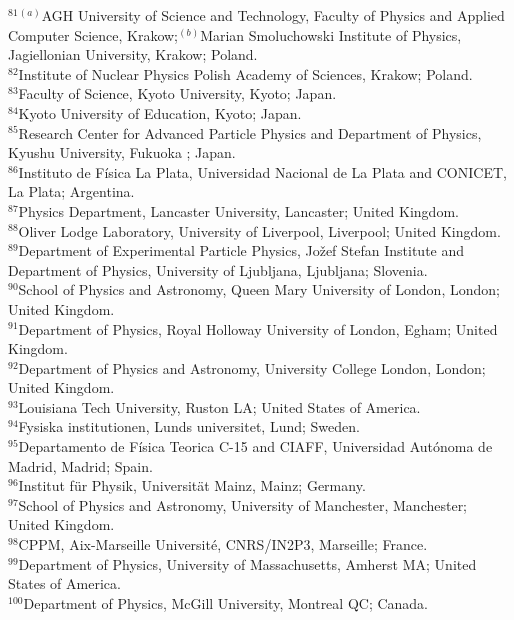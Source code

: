 \begin{flushleft}
$^{81}$$^{(a)}$AGH University of Science and Technology, Faculty of Physics and Applied Computer Science, Krakow;$^{(b)}$Marian Smoluchowski Institute of Physics, Jagiellonian University, Krakow; Poland.\\
$^{82}$Institute of Nuclear Physics Polish Academy of Sciences, Krakow; Poland.\\
$^{83}$Faculty of Science, Kyoto University, Kyoto; Japan.\\
$^{84}$Kyoto University of Education, Kyoto; Japan.\\
$^{85}$Research Center for Advanced Particle Physics and Department of Physics, Kyushu University, Fukuoka ; Japan.\\
$^{86}$Instituto de F\'{i}sica La Plata, Universidad Nacional de La Plata and CONICET, La Plata; Argentina.\\
$^{87}$Physics Department, Lancaster University, Lancaster; United Kingdom.\\
$^{88}$Oliver Lodge Laboratory, University of Liverpool, Liverpool; United Kingdom.\\
$^{89}$Department of Experimental Particle Physics, Jo\v{z}ef Stefan Institute and Department of Physics, University of Ljubljana, Ljubljana; Slovenia.\\
$^{90}$School of Physics and Astronomy, Queen Mary University of London, London; United Kingdom.\\
$^{91}$Department of Physics, Royal Holloway University of London, Egham; United Kingdom.\\
$^{92}$Department of Physics and Astronomy, University College London, London; United Kingdom.\\
$^{93}$Louisiana Tech University, Ruston LA; United States of America.\\
$^{94}$Fysiska institutionen, Lunds universitet, Lund; Sweden.\\
$^{95}$Departamento de F\'isica Teorica C-15 and CIAFF, Universidad Aut\'onoma de Madrid, Madrid; Spain.\\
$^{96}$Institut f\"{u}r Physik, Universit\"{a}t Mainz, Mainz; Germany.\\
$^{97}$School of Physics and Astronomy, University of Manchester, Manchester; United Kingdom.\\
$^{98}$CPPM, Aix-Marseille Universit\'e, CNRS/IN2P3, Marseille; France.\\
$^{99}$Department of Physics, University of Massachusetts, Amherst MA; United States of America.\\
$^{100}$Department of Physics, McGill University, Montreal QC; Canada.\\
$$
\end{flushleft}

